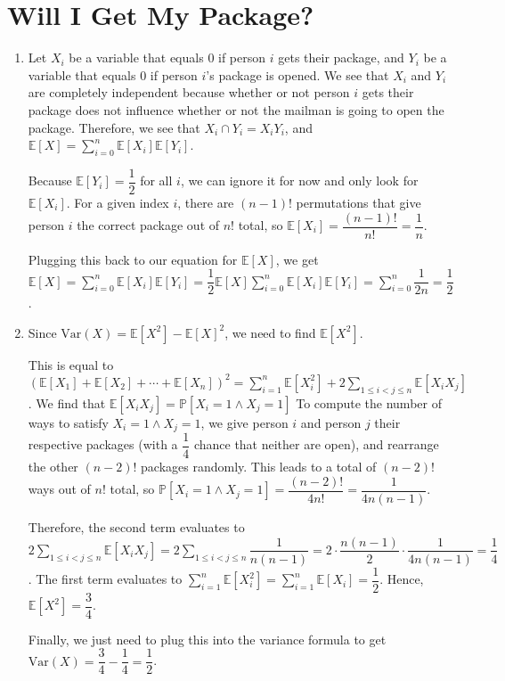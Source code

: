 \documentclass{article}
\newcommand{\p}{\mathbb{P}}
\newcommand{\ex}{\mathbb{E}}
\newcommand{\Var}{\text{Var}}
\begin{document}
\newpage
\section{Will I Get My Package?}
\begin{enumerate}[label=(\alph*)]
	\item Let $X_i$ be a variable that equals $0$ if person $i$ gets their package, and $Y_i$ be a variable that equals $0$ if person $i$'s package is opened. We see that $X_i$ and $Y_i$ are completely independent because whether or not person $i$ gets their package does not influence whether or not the mailman is going to open the package. Therefore, we see that $X_i \cap Y_i = X_iY_i$, and $\ex[X] = \sum_{i=0}^n \ex[X_i] \ex[Y_i]$.
	
	Because $\ex[Y_i] = \dfrac{1}{2}$ for all $i$, we can ignore it for now and only look for $\ex[X_i]$. For a given index $i$, there are $(n-1)!$ permutations that give person $i$ the correct package out of $n!$ total, so $\ex[X_i] = \dfrac{(n-1)!}{n!} = \dfrac{1}{n}$.

	Plugging this back to our equation for $\ex[X]$, we get $\ex[X] = \sum_{i=0}^n \ex[X_i] \ex[Y_i] = \dfrac{1}{2} \ex[X] \sum_{i=0}^n \ex[X_i] \ex[Y_i] = \sum_{i=0}^n \dfrac{1}{2n} = \boxed{\dfrac{1}{2}}$.
	\item Since $\Var(X) = \ex[X^2] - \ex[X]^2$, we need to find $\ex[X^2]$.
	
	This is equal to $(\ex[X_1] + \ex[X_2] + \cdots + \ex[X_n])^2 = \sum_{i = 1}^n \ex[X_i^2] + 2 \sum_{1 \leq i < j \leq n} \ex[X_i X_j]$. We find that $\ex[X_i X_j] = \p[X_i = 1 \wedge X_j = 1]$ To compute the number of ways to satisfy $X_i=1 \wedge X_j=1$, we give person $i$ and person $j$ their respective packages (with a $\dfrac{1}{4}$ chance that neither are open), and rearrange the other $(n-2)!$ packages randomly. This leads to a total of $(n-2)!$ ways out of $n!$ total, so $\p[X_i=1 \wedge X_j=1] = \dfrac{(n-2)!}{4n!} = \dfrac{1}{4n(n-1)}$.

	Therefore, the second term evaluates to $2 \sum_{1 \leq i < j \leq n} \ex[X_i X_j] = 2 \sum_{1 \leq i < j \leq n} \dfrac{1}{n(n-1)} = 2 \cdot \dfrac{n(n-1)}{2} \cdot \dfrac{1}{4n(n-1)} = \dfrac{1}{4}$. The first term evaluates to $\sum_{i = 1}^n \ex[X_i^2] = \sum_{i = 1}^n \ex[X_i] = \dfrac{1}{2}$. Hence, $\ex[X^2] = \dfrac{3}{4}$.

	Finally, we just need to plug this into the variance formula to get $\Var(X) = \dfrac{3}{4} - \dfrac{1}{4} = \boxed{\dfrac{1}{2}}$.
\end{enumerate}
\end{document}

